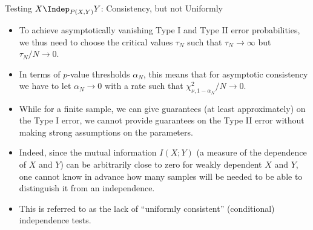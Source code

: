 \begin{frame}{Testing $X \Indep_{P(X,Y)} Y$: Consistency, but not Uniformly}
  \begin{itemize}
    \item To achieve asymptotically vanishing Type I and Type II error probabilities, we thus need 
      to choose the critical values $\tau_N$ such that $\tau_N \to \infty$ but $\tau_N / N \to 0$.
    \item In terms of $p$-value thresholds $\alpha_N$, this means that for asymptotic consistency we have to let
       $\alpha_N \to 0$ with a rate such that $\chi^2_{\nu,1-\alpha_N} / N \to 0$.
    \item While for a finite sample, we can give guarantees (at least approximately) on the Type I error, we cannot
      provide guarantees on the Type II error without making strong assumptions on the parameters. 
    \item Indeed, since the mutual information $I(X;Y)$ (a measure of
the dependence of $X$ and $Y$) can be arbitrarily close to zero for weakly dependent $X$ 
and $Y$, one cannot know in advance how many samples will be needed to be able to distinguish
it from an independence.
    \item This is referred to as the lack of ``uniformly consistent'' (conditional) independence tests.
  \end{itemize}
\end{frame}


